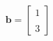 \documentclass[preview]{standalone}
\begin{document}
\begin{align*}
\mathbf{b} = \begin{bmatrix} 1 \\ \\3 \end{bmatrix}
\end{align*}
\end{document}
